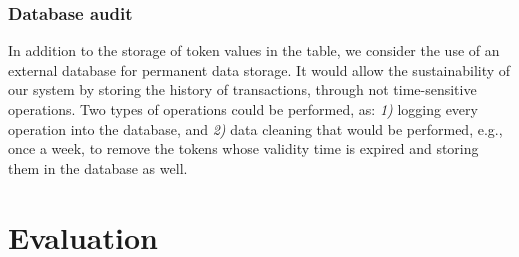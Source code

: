 \documentclass{llncs}
\begin{document}
\subsubsection{Database audit}

In addition to the storage of token values in the table, we consider the use of an external database for permanent data storage. It would allow the sustainability of our system by storing the history of transactions, through not time-sensitive operations. Two types of operations could be performed, as: \textit{1)} logging every operation into the database, and \textit{2)} data cleaning that would be performed, e.g., once a week, to remove the tokens whose validity time is expired and storing them in the database as well.

\section{Evaluation}\label{sect:eval}
\end{document}
